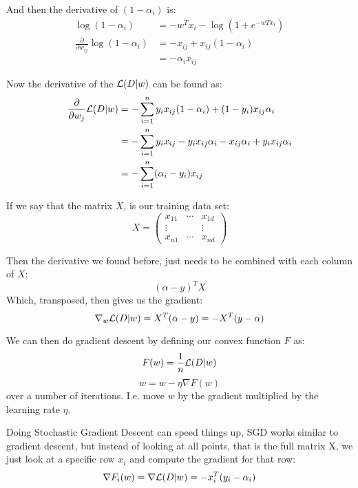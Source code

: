     And then the derivative of $(1-\alpha_i)$ is:
    \begin{align*}
        \log(1-\alpha_i) &= -w^Tx_i-\log(1+e^{-wTx_i})\\
        \frac{\partial}{\partial w_{ij}} \log(1-\alpha_i) &= -x_{ij} + 
        x_{ij}(1-\alpha_i)\\
            &=-\alpha_ix_{ij}
    \end{align*}
    
    Now the derivative of the $\mathcal{L}(D | w)$ can be found as:
    \begin{align*}
        \frac{\partial}{\partial w_j}\mathcal{L}(D | w)&=-\sum_{i=1}^{n} y_i 
        x_{ij}(1-\alpha_i) + (1-y_i)x_{ij}\alpha_i\\
            &= -\sum_{i=1}^{n} y_ix_{ij}-y_ix_{ij}\alpha_i - x_{ij}\alpha_i + 
            y_i x_{ij}\alpha_i\\
            &=-\sum_{i=1}^{n} (\alpha_i - y_i) x_{ij}
    \end{align*}
    
    If we say that the matrix $X$, is our training data set:
    \begin{equation*}
        X=\begin{pmatrix}
        x_{11} & \cdots & x_{1d}\\
        \vdots & & \vdots\\
        x_{n1} & \cdots & x_{nd}
        \end{pmatrix}
    \end{equation*}
    
    Then the derivative we found before, just needs to be combined with each 
    column of $X$:
    \begin{equation*}
        (\alpha - y)^TX
    \end{equation*}
    Which, transposed, then gives us the gradient:
    \begin{equation*}
        \nabla_w \mathcal{L}(D|w) = X^T(\alpha - y) = -X^T(y - \alpha)
    \end{equation*}
    
    We can then do gradient descent by defining our convex function $F$ as:
    \begin{equation}
        F(w) = \frac{1}{n} \mathcal{L}(D | w)
    \end{equation}
    \begin{equation*}
        w = w-\eta\nabla F(w)
    \end{equation*}
    over a number of iterations. I.e. move $w$ by the gradient multiplied by 
    the learning rate $\eta$.
    
    Doing Stochastic Gradient Descent can speed things up, SGD works similar to 
    gradient descent, but instead of looking at all points, that is the full 
    matrix X, we just look at a specific row $x_i$ and compute the gradient for 
    that row:
    \begin{equation*}
        \nabla F_i(w) = \nabla \mathcal{L}(D|w) = -x_i^T(y_i - \alpha_i)
    \end{equation*}
    
